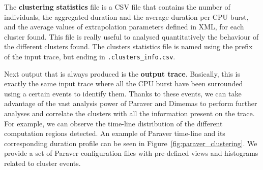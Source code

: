 \documentclass[a4paper, 12pt]{article}
\begin{document}
The \textbf{clustering statistics} file is a CSV file that contains the number
of individuals, the aggregated duration and the average duration per CPU 
burst, and the average values of extrapolation parameters defined in XML,
for each cluster found. This file is really useful to analysed quantitatively
the behaviour of the different clusters found. The clusters statistics file 
is named using the prefix of the input trace, but ending in 
\texttt{.clusters\_info.csv}.


Next output that is always produced is the \textbf{output trace}. Basically,
this is exactly the same input trace where all the CPU burst have been
surrounded using a certain events to identify them. Thanks to these events, we
can take advantage of the vast analysis power of Paraver and Dimemas to 
perform further analyses and correlate the clusters with all the information
present on the trace. For example, we can observe the time-line distribution 
of the different computation regions detected. An example of Paraver 
time-line and its corresponding duration profile can be seen in 
Figure~\ref{fig:paraver_clustering}. We provide a set of Paraver configuration
files with pre-defined views and histograms related to cluster events.
\end{document}

